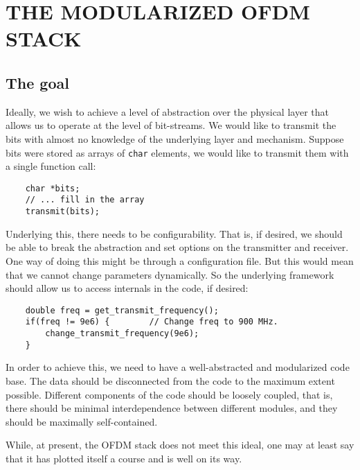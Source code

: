 \chapter{THE MODULARIZED OFDM STACK}
\label{chap:ofdm-stack}


\section{The goal}

Ideally, we wish to achieve a level of abstraction over the physical layer that
allows us to operate at the level of bit-streams. We would like to transmit the
bits with almost no knowledge of the underlying layer and mechanism. Suppose
bits were stored as arrays of \lstinline!char! elements, we would like to
transmit them with a single function call:

\begin{lstlisting}
	char *bits;
	// ... fill in the array
	transmit(bits);
\end{lstlisting}

Underlying this, there needs to be configurability. That is, if desired, we
should be able to break the abstraction and set options on the transmitter and
receiver. One way of doing this might be through a configuration file. But this
would mean that we cannot change parameters dynamically. So the underlying
framework should allow us to access internals in the code, if desired:

\begin{lstlisting}
	double freq = get_transmit_frequency();
	if(freq != 9e6) {        // Change freq to 900 MHz.
		change_transmit_frequency(9e6);
	}
\end{lstlisting}

In order to achieve this, we need to have a well-abstracted and modularized
code base. The data should be disconnected from the code to the maximum extent
possible. Different components of the code should be loosely coupled, that is,
there should be minimal interdependence between different modules, and they
should be maximally self-contained.

While, at present, the OFDM stack does not meet this ideal, one may at least
say that it has plotted itself a course and is well on its way.


